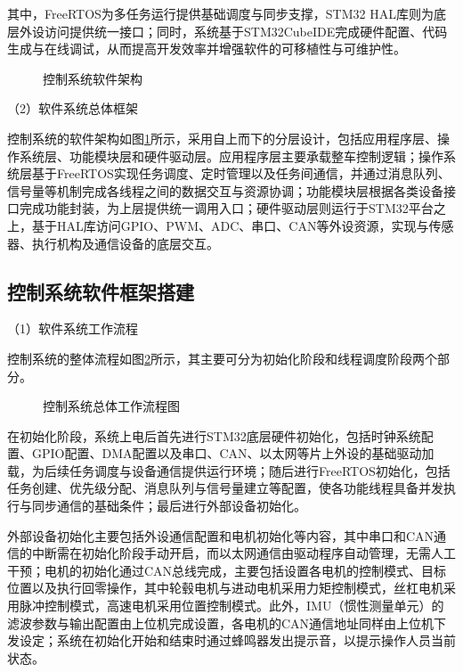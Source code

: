 其中，FreeRTOS为多任务运行提供基础调度与同步支撑，STM32 HAL库则为底层外设访问提供统一接口；同时，系统基于STM32CubeIDE完成硬件配置、代码生成与在线调试，从而提高开发效率并增强软件的可移植性与可维护性。

\begin{figure}[h]
  \centering
  
  \caption{控制系统软件架构}
  \label{控制系统软件架构}
\end{figure}

（2）软件系统总体框架

控制系统的软件架构如图\ref{控制系统软件架构}所示，采用自上而下的分层设计，包括应用程序层、操作系统层、功能模块层和硬件驱动层。应用程序层主要承载整车控制逻辑；操作系统层基于FreeRTOS实现任务调度、定时管理以及任务间通信，并通过消息队列、信号量等机制完成各线程之间的数据交互与资源协调；功能模块层根据各类设备接口完成功能封装，为上层提供统一调用入口；硬件驱动层则运行于STM32平台之上，基于HAL库访问GPIO、PWM、ADC、串口、CAN等外设资源，实现与传感器、执行机构及通信设备的底层交互。

\subsection{控制系统软件框架搭建}

（1）软件系统工作流程

控制系统的整体流程如图\ref{控制系统总体工作流程图}所示，其主要可分为初始化阶段和线程调度阶段两个部分。

\begin{figure}[h]
  \centering
  
  \caption{控制系统总体工作流程图}
  \label{控制系统总体工作流程图}
\end{figure}

在初始化阶段，系统上电后首先进行STM32底层硬件初始化，包括时钟系统配置、GPIO配置、DMA配置以及串口、CAN、以太网等片上外设的基础驱动加载，为后续任务调度与设备通信提供运行环境；随后进行FreeRTOS初始化，包括任务创建、优先级分配、消息队列与信号量建立等配置，使各功能线程具备并发执行与同步通信的基础条件；最后进行外部设备初始化。

外部设备初始化主要包括外设通信配置和电机初始化等内容，其中串口和CAN通信的中断需在初始化阶段手动开启，而以太网通信由驱动程序自动管理，无需人工干预；电机的初始化通过CAN总线完成，主要包括设置各电机的控制模式、目标位置以及执行回零操作，其中轮毂电机与进动电机采用力矩控制模式，丝杠电机采用脉冲控制模式，高速电机采用位置控制模式。此外，IMU（惯性测量单元）的滤波参数与输出配置由上位机完成设置，各电机的CAN通信地址同样由上位机下发设定；系统在初始化开始和结束时通过蜂鸣器发出提示音，以提示操作人员当前状态。


